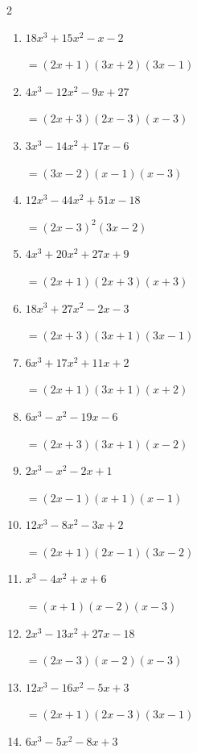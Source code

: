 \begin{multicols}{2}
\begin{enumerate}
\resetques

  \item $18x^{3}+15x^{2}-x-2$

        $=(2x+1)(3x+2)(3x-1)$

  \item $4x^{3}-12x^{2}-9x+27$

        $=(2x+3)(2x-3)(x-3)$

  \item $3x^{3}-14x^{2}+17x-6$

        $=(3x-2)(x-1)(x-3)$

  \item $12x^{3}-44x^{2}+51x-18$

        $=(2x-3) ^{ 2 }(3x-2)$

  \item $4x^{3}+20x^{2}+27x+9$

        $=(2x+1)(2x+3)(x+3)$

\columnbreak %

  \item $18x^{3}+27x^{2}-2x-3$

        $=(2x+3)(3x+1)(3x-1)$

  \item $6x^{3}+17x^{2}+11x+2$

        $=(2x+1)(3x+1)(x+2)$

  \item $6x^{3}-x^{2}-19x-6$

        $=(2x+3)(3x+1)(x-2)$

  \item $2x^{3}-x^{2}-2x+1$

        $=(2x-1)(x+1)(x-1)$

  \item $12x^{3}-8x^{2}-3x+2$

        $=(2x+1)(2x-1)(3x-2)$

\columnbreak %

\resetques

  \item $x^{3}-4x^{2}+x+6$

        $=(x+1)(x-2)(x-3)$

  \item $2x^{3}-13x^{2}+27x-18$

        $=(2x-3)(x-2)(x-3)$

  \item $12x^{3}-16x^{2}-5x+3$

        $=(2x+1)(2x-3)(3x-1)$

  \item $6x^{3}-5x^{2}-8x+3$


\end{enumerate}
\end{multicols}
